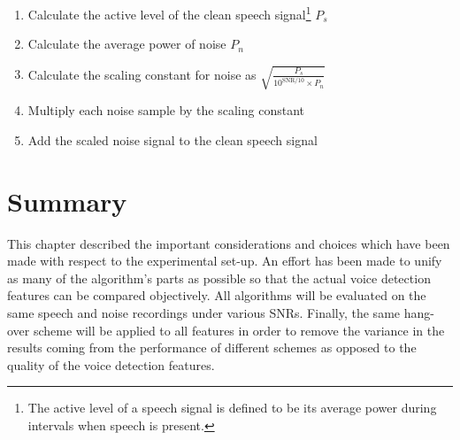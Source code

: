 \begin{enumerate}
\item Calculate the active level of the clean speech signal\footnote{The active level of a speech signal is defined to be its average power during intervals when speech is present.} $P_s$
\item Calculate the average power of noise $P_n$
\item Calculate the scaling constant for noise as $\sqrt{\frac{P_s}{10^{\text{SNR}/10} \times P_n}}$
\item Multiply each noise sample by the scaling constant
\item Add the scaled noise signal to the clean speech signal
\end{enumerate}


\section{Summary}

This chapter described the important considerations and choices which have been made with respect to the experimental set-up. An effort has been made to unify as many of the algorithm's parts as possible so that the actual voice detection features can be compared objectively. All algorithms will be evaluated on the same speech and noise recordings under various SNRs. Finally, the same hang-over scheme will be applied to all features in order to remove the variance in the results coming from the performance of different schemes as opposed to the quality of the voice detection features.